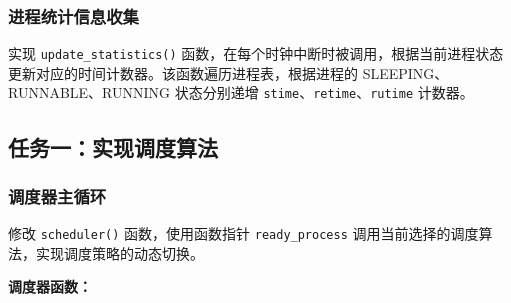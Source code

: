 \documentclass[a4paper, 12pt]{article}
\begin{document}
    
    
    \subsubsection{进程统计信息收集}
    实现 \texttt{update\_statistics()} 函数，在每个时钟中断时被调用，根据当前进程状态更新对应的时间计数器。该函数遍历进程表，根据进程的 SLEEPING、RUNNABLE、RUNNING 状态分别递增 \texttt{stime}、\texttt{retime}、\texttt{rutime} 计数器。
    
    \subsection{任务一：实现调度算法}
    
    \subsubsection{调度器主循环}
    修改 \texttt{scheduler()} 函数，使用函数指针 \texttt{ready\_process} 调用当前选择的调度算法，实现调度策略的动态切换。
    
   \textbf{ 调度器函数：}
    
\end{document}
